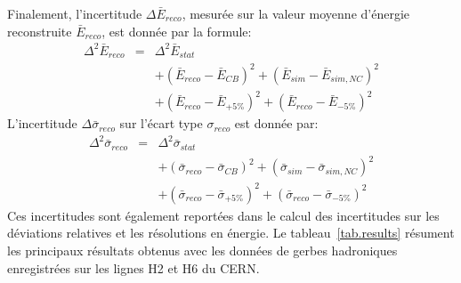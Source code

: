Finalement, l'incertitude $\Delta \bar E_{reco}$, mesurée sur la valeur moyenne d'énergie reconstruite $\bar E_{reco}$, est donnée par la formule:
\begin{eqnarray*}
  \Delta^2 \bar E_{reco} & = & \Delta^2 \bar E_{stat} \\
  & & + (\bar E_{reco}-\bar E_{CB})^2 + (\bar E_{sim}-\bar E_{sim,NC})^2 \\
  & & + (\bar E_{reco}-\bar E_{+5\%})^2 + (\bar E_{reco}-\bar E_{-5\%})^2
\end{eqnarray*}
L'incertitude $\Delta \bar \sigma_{reco}$ sur l'écart type $\sigma_{reco}$ est donnée par:
\begin{eqnarray*}
  \Delta^2 \bar \sigma_{reco} & = & \Delta^2 \bar \sigma_{stat} \\
  & & + (\bar \sigma_{reco}-\bar \sigma_{CB})^2 + (\bar \sigma_{sim}-\bar \sigma_{sim,NC})^2 \\
  & & + (\bar \sigma_{reco}-\bar \sigma_{+5\%})^2 + (\bar \sigma_{reco}-\bar \sigma_{-5\%})^2
\end{eqnarray*}
Ces incertitudes sont également reportées dans le calcul des incertitudes sur les déviations relatives et les résolutions en énergie. Le tableau~\ref{tab.results} résument les principaux résultats obtenus avec les données de gerbes hadroniques enregistrées sur les lignes H2 et H6 du CERN.
